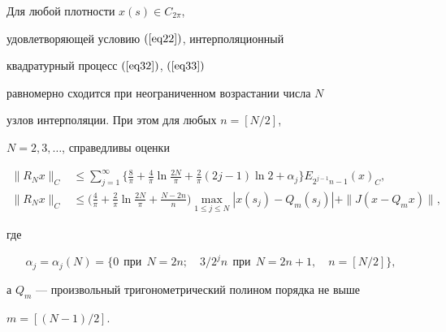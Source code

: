 \begin{lem}


Для любой плотности $x(s)\in C_{2\pi}$,


удовлетворяющей условию $(\ref{eq22})$, интерполяционный


квадратурный процесс $(\ref{eq32})$, $(\ref{eq33})$


равномерно сходится при неограниченном возрастании числа $N$


узлов интерполяции. При этом для любых $n=[N/2]$,


$N=2,3,\dotsc$, справедливы оценки


\begin{align}


\label{eq34}


\|R_Nx\|_C &\leq \sum_{j=1}^\infty \bigg\{\frac{8}{\pi}


+ \frac{4}{\pi}\ln\frac{2N}{\pi} + \frac{2}{\pi} (2j-1)


\ln2 + \alpha_j\bigg\} E_{2^{j-1}n-1}(x)_C, \\


%


\label{eq35}


\|R_Nx\|_C&\leq\bigg(\frac{4}{\pi} + \frac{2}{\pi}


\ln\frac{2N}{\pi} + \frac{N-2n}{n}\bigg)\max_{1\leq j \leq


N}|x(s_j)-Q_m(s_j)| +\|J(x-Q_mx)\|,


\end{align}


где


$$


\alpha_j = \alpha_j(N) = \{0\ \ \text{при}


\ \ N=2n;\quad {3}/{2^jn}\ \ \text{при}\ \ N=2n+1, \quad


n = [{N}/{2}]\},


$$


а $Q_m$ --- произвольный тригонометрический полином порядка не выше


$m=[(N-1)/2]$.


\end{lem}











